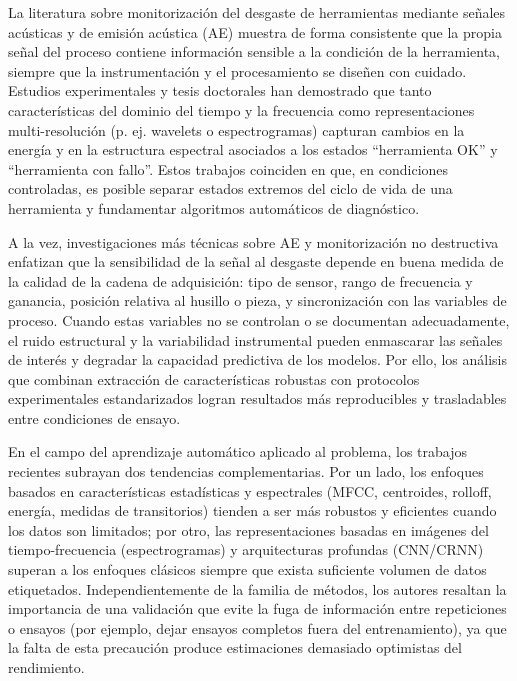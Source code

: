 \documentclass[12pt, letterpaper]{report}
\begin{document}
La literatura sobre monitorización del desgaste de herramientas mediante señales acústicas y de emisión acústica (AE) muestra de forma consistente que la propia señal del proceso contiene información sensible a la condición de la herramienta, siempre que la instrumentación y el procesamiento se diseñen con cuidado. Estudios experimentales y tesis doctorales han demostrado que tanto características del dominio del tiempo y la frecuencia como representaciones multi-resolución (p. ej. wavelets o espectrogramas) capturan cambios en la energía y en la estructura espectral asociados a los estados “herramienta OK” y “herramienta con fallo”. Estos trabajos coinciden en que, en condiciones controladas, es posible separar estados extremos del ciclo de vida de una herramienta y fundamentar algoritmos automáticos de diagnóstico. 

A la vez, investigaciones más técnicas sobre AE y monitorización no destructiva enfatizan que la sensibilidad de la señal al desgaste depende en buena medida de la calidad de la cadena de adquisición: tipo de sensor, rango de frecuencia y ganancia, posición relativa al husillo o pieza, y sincronización con las variables de proceso. Cuando estas variables no se controlan o se documentan adecuadamente, el ruido estructural y la variabilidad instrumental pueden enmascarar las señales de interés y degradar la capacidad predictiva de los modelos. Por ello, los análisis que combinan extracción de características robustas con protocolos experimentales estandarizados logran resultados más reproducibles y trasladables entre condiciones de ensayo. 

En el campo del aprendizaje automático aplicado al problema, los trabajos recientes subrayan dos tendencias complementarias. Por un lado, los enfoques basados en características estadísticas y espectrales (MFCC, centroides, rolloff, energía, medidas de transitorios) tienden a ser más robustos y eficientes cuando los datos son limitados; por otro, las representaciones basadas en imágenes del tiempo-frecuencia (espectrogramas) y arquitecturas profundas (CNN/CRNN) superan a los enfoques clásicos siempre que exista suficiente volumen de datos etiquetados. Independientemente de la familia de métodos, los autores resaltan la importancia de una validación que evite la fuga de información entre repeticiones o ensayos (por ejemplo, dejar ensayos completos fuera del entrenamiento), ya que la falta de esta precaución produce estimaciones demasiado optimistas del rendimiento. 
\end{document}
